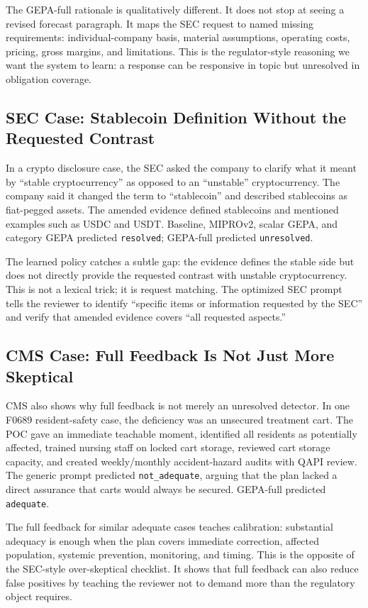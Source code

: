 \documentclass[11pt]{article}
\begin{document}
The GEPA-full rationale is qualitatively different. It does not stop at seeing a revised forecast paragraph. It maps the SEC request to named missing requirements: individual-company basis, material assumptions, operating costs, pricing, gross margins, and limitations. This is the regulator-style reasoning we want the system to learn: a response can be responsive in topic but unresolved in obligation coverage.

\subsection{SEC Case: Stablecoin Definition Without the Requested Contrast}

In a crypto disclosure case, the SEC asked the company to clarify what it meant by ``stable cryptocurrency'' as opposed to an ``unstable'' cryptocurrency. The company said it changed the term to ``stablecoin'' and described stablecoins as fiat-pegged assets. The amended evidence defined stablecoins and mentioned examples such as USDC and USDT. Baseline, MIPROv2, scalar GEPA, and category GEPA predicted \texttt{resolved}; GEPA-full predicted \texttt{unresolved}.

The learned policy catches a subtle gap: the evidence defines the stable side but does not directly provide the requested contrast with unstable cryptocurrency. This is not a lexical trick; it is request matching. The optimized SEC prompt tells the reviewer to identify ``specific items or information requested by the SEC'' and verify that amended evidence covers ``all requested aspects.''

\subsection{CMS Case: Full Feedback Is Not Just More Skeptical}

CMS also shows why full feedback is not merely an unresolved detector. In one F0689 resident-safety case, the deficiency was an unsecured treatment cart. The POC gave an immediate teachable moment, identified all residents as potentially affected, trained nursing staff on locked cart storage, reviewed cart storage capacity, and created weekly/monthly accident-hazard audits with QAPI review. The generic prompt predicted \texttt{not\_adequate}, arguing that the plan lacked a direct assurance that carts would always be secured. GEPA-full predicted \texttt{adequate}.

The full feedback for similar adequate cases teaches calibration: substantial adequacy is enough when the plan covers immediate correction, affected population, systemic prevention, monitoring, and timing. This is the opposite of the SEC-style over-skeptical checklist. It shows that full feedback can also reduce false positives by teaching the reviewer not to demand more than the regulatory object requires.
\end{document}
